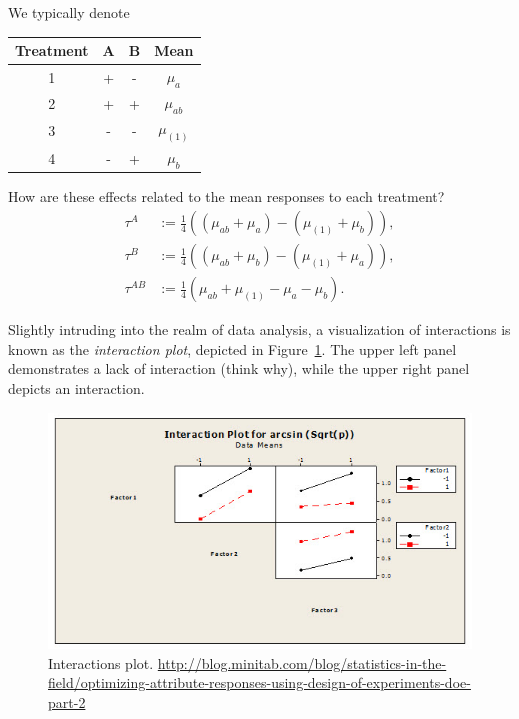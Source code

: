 We typically denote
\begin{table}[H]
\centering
\begin{tabular}{|c|c|c|c|}
\hline Treatment & A & B & Mean \\ 
\hline 1 & + & - & $\mu_a$ \\ 
\hline 2 & + & + & $\mu_{ab}$ \\ 
\hline 3 & - & - & $\mu_{(1)}$ \\ 
\hline 4 & - & + & $\mu_b$ \\ 
\hline 
\end{tabular} 
\end{table}
How are these effects related to the mean responses to each treatment?
\begin{align}
	\tau^A &:= \frac{1}{4}\left( (\mu_{ab}+\mu_a)- (\mu_{(1)}+\mu_b)\right), \\
	\tau^B &:= \frac{1}{4}\left( (\mu_{ab}+\mu_b) - (\mu_{(1)}+\mu_a)  \right), \\
	\tau^{AB} &:= \frac{1}{4}\left( \mu_{ab} +  \mu_{(1)} -  \mu_a - \mu_b \right).	
\end{align}




Slightly intruding into the realm of data analysis, a visualization of interactions is known as the \emph{interaction plot}, depicted in Figure~\ref{fig:interaction_plot}. 
The upper left panel demonstrates a lack of interaction (think why), while the upper right panel depicts an interaction.
\begin{figure}[ht]
\centering
\includegraphics[width=0.3\textheight]{art/attribute_doe_interaction_plot}
\caption[Interactions plot]{Interactions plot. \newline \url{http://blog.minitab.com/blog/statistics-in-the-field/optimizing-attribute-responses-using-design-of-experiments-doe-part-2}}
\label{fig:interaction_plot}
\end{figure}


